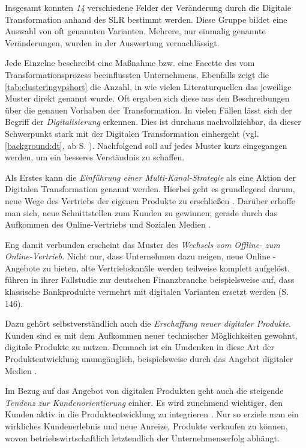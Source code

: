 Insgesamt konnten \textit{14} verschiedene Felder der Veränderung durch die Digitale Transformation anhand des SLR bestimmt werden. Diese Gruppe bildet eine Auswahl von oft genannten Varianten. Mehrere, nur einmalig genannte  Veränderungen, wurden in der Auswertung vernachlässigt.

Jede Einzelne beschreibt eine Maßnahme bzw. eine Facette des vom Transformationsprozess beeinflussten Unternehmens.  Ebenfalls zeigt die \ref{tab:clusteringvpshort} die Anzahl, in wie vielen Literaturquellen das jeweilige Muster direkt genannt wurde. Oft ergaben sich diese aus den Beschreibungen über die genauen Vorhaben der Transformation. 
In vielen Fällen lässt sich der Begriff der \textit{Digitalisierung} erkennen. Dies ist durchaus nachvollziehbar, da dieser Schwerpunkt stark mit der Digitalen Transformation einhergeht (vgl. \ref{background:dt}, ab S. \pageref{background:dt}). Nachfolgend soll auf jedes Muster kurz eingegangen werden, um ein besseres Verständnis zu schaffen.

Als Erstes kann die \textit{Einführung einer Multi-Kanal-Strategie} als eine Aktion der Digitalen Transformation genannt werden. Hierbei geht es grundlegend darum, neue  Wege des Vertriebs der eigenen Produkte zu erschließen \cite[S. 242]{muchna_aspekte_2018}. Darüber erhoffe man sich, neue Schnittstellen zum Kunden zu gewinnen; gerade durch das Aufkommen des Online-Vertriebs und Sozialen Medien \cite[S. 21]{solis_2017_2017}.

Eng damit verbunden erscheint das Muster des \textit{Wechsels vom Offline- zum Online-Vertrieb}. Nicht nur, dass Unternehmen dazu neigen, neue Online - Angebote zu bieten, alte Vertriebskanäle werden teilweise komplett aufgelöst.  führen in ihrer Fallstudie zur deutschen Finanzbranche beispielsweise auf, dass klassische Bankprodukte vermehrt  mit digitalen Varianten ersetzt werden (S. 146).

Dazu gehört selbstverständlich auch die \textit{Erschaffung neuer digitaler Produkte}. Kunden sind es mit dem Aufkommen neuer technischer Möglichkeiten gewohnt, digitale Produkte zu nutzen. Demnach ist ein Umdenken in diese Art der Produktentwicklung unumgänglich, beispielsweise durch das Angebot digitaler Medien \cite[S. 303]{heinemann_digitale_2016}. 

Im Bezug auf das Angebot von digitalen Produkten geht auch die steigende \textit{Tendenz zur Kundenorientierung} einher. Es wird zunehmend wichtiger, den Kunden aktiv in die Produktentwicklung zu integrieren \cite[S. 17]{depiereux_studie_2018}. Nur so erziele man ein wirkliches Kundenerlebnis und neue Anreize, Produkte verkaufen zu können, wovon betriebswirtschaftlich letztendlich der Unternehmenserfolg abhängt.

